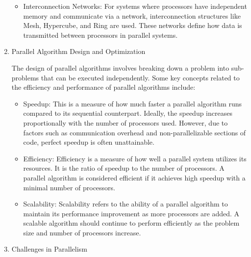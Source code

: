 \documentclass[a4paper, 10pt]{book}
\begin{document}
\begin{enumerate}
\begin{itemize}
\begin{itemize}
                    \end{itemize}

                    \item {\bold Interconnection Networks:} For systems where processors have independent memory and communicate via a network, interconnection structures like Mesh, Hypercube, and Ring are used. These networks define how data is transmitted between processors in parallel systems.

                \end{itemize}

            \item {\bold Parallel Algorithm Design and Optimization}
            
                The design of parallel algorithms involves breaking down a problem into sub-problems that can be executed independently. Some key concepts related to the efficiency and performance of parallel algorithms include:

                \begin{itemize}
                    
                    \item {\bold Speedup:} This is a measure of how much faster a parallel algorithm runs compared to its sequential counterpart. Ideally, the speedup increases proportionally with the number of processors used. However, due to factors such as communication overhead and non-parallelizable sections of code, perfect speedup is often unattainable.

                    \item {\bold Efficiency:} Efficiency is a measure of how well a parallel system utilizes its resources. It is the ratio of speedup to the number of processors. A parallel algorithm is considered efficient if it achieves high speedup with a minimal number of processors.

                    \item {\bold Scalability:} Scalability refers to the ability of a parallel algorithm to maintain its performance improvement as more processors are added. A scalable algorithm should continue to perform efficiently as the problem size and number of processors increase.

                \end{itemize}
            
            \item {\bold Challenges in Parallelism}
            

\end{enumerate}
\end{document}

